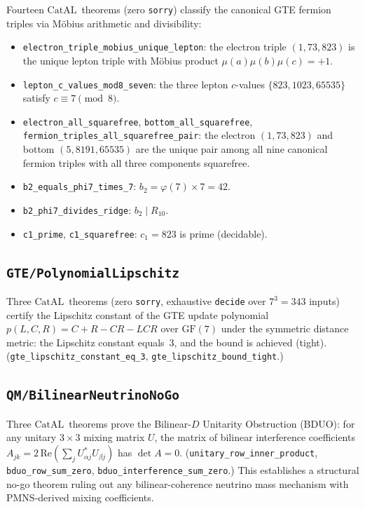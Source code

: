 \documentclass[11pt,a4paper]{article}
\theoremstyle{definition}
\newcommand{\CatAL}{\ensuremath{\mathrm{CatAL}}}
\begin{document}
Fourteen \CatAL\ theorems (zero \texttt{sorry}) classify the canonical GTE fermion triples
via Möbius arithmetic and divisibility:
\begin{itemize}[nosep]
\item \lstinline|electron_triple_mobius_unique_lepton|: the electron triple $(1,73,823)$
  is the unique lepton triple with Möbius product $\mu(a)\mu(b)\mu(c) = +1$.
\item \lstinline|lepton_c_values_mod8_seven|: the three lepton $c$-values $\{823,1023,65535\}$
  satisfy $c \equiv 7 \pmod 8$.
\item \lstinline|electron_all_squarefree|, \lstinline|bottom_all_squarefree|,
  \lstinline|fermion_triples_all_squarefree_pair|: the electron $(1,73,823)$ and bottom
  $(5,8191,65535)$ are the unique pair among all nine canonical fermion triples with all
  three components squarefree.
\item \lstinline|b2_equals_phi7_times_7|: $b_2 = \varphi(7)\times7 = 42$.
\item \lstinline|b2_phi7_divides_ridge|: $b_2 \mid R_{10}$.
\item \lstinline|c1_prime|, \lstinline|c1_squarefree|: $c_1 = 823$ is prime (decidable).
\end{itemize}

\subsection{\texttt{GTE/PolynomialLipschitz}}\label{subsec:poly-lipschitz}

Three \CatAL\ theorems (zero \texttt{sorry}, exhaustive \lstinline|decide| over
$7^3 = 343$ inputs) certify the Lipschitz constant of the GTE update polynomial
$p(L,C,R) = C+R-CR-LCR$ over $\mathrm{GF}(7)$ under the symmetric distance metric:
the Lipschitz constant equals~3, and the bound is achieved (tight).
(\lstinline|gte_lipschitz_constant_eq_3|, \lstinline|gte_lipschitz_bound_tight|.)

\subsection{\texttt{QM/BilinearNeutrinoNoGo}}\label{subsec:bduo}

Three \CatAL\ theorems prove the Bilinear-$D$ Unitarity Obstruction (BDUO):
for any unitary $3\times3$ mixing matrix $U$, the matrix of bilinear interference
coefficients $A_{jk} = 2\,\mathrm{Re}\!\left(\sum_j U^*_{\alpha j} U_{\beta j}\right)$
has $\det A = 0$.
(\lstinline|unitary_row_inner_product|, \lstinline|bduo_row_sum_zero|,
\lstinline|bduo_interference_sum_zero|.)
This establishes a structural no-go theorem ruling out any bilinear-coherence neutrino
mass mechanism with PMNS-derived mixing coefficients.
\end{document}
